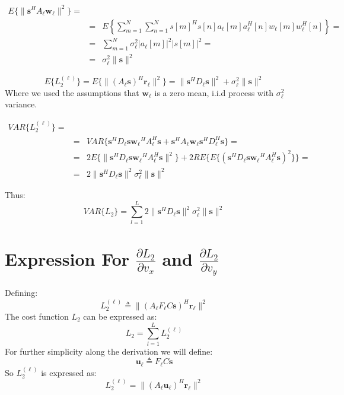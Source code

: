 \documentclass[10pt,a4paper]{report}
\begin{document}
\begin{eqnarray}
E\{\|\mathbf{s}^H A_\ell \mathbf{w_\ell}\|^2\}= \\
&=& E\left\{\sum_{m=1}^N\sum_{n=1}^N s[m]^H s[n] a_\ell[m] a_\ell^H[n] w_\ell[m] w_\ell^H[n]\right\}= \nonumber \\
&=& \sum_{m=1}^N \sigma_\ell^2 |a_\ell[m]|^2 |s[m]|^2 = \nonumber \\
&=& \sigma_\ell^2 \|\mathbf{s}\|^2 \nonumber
\end{eqnarray}

\begin{equation}
E\{L_2^{(\ell)}\}=E\{\|(A_\ell\mathbf{s})^H\mathbf{r_\ell}\|^2\}= \|\mathbf{s}^H D_\ell \mathbf{s}\|^2 + \sigma_\ell^2\|\mathbf{s}\|^2
\end{equation}
Where we used the assumptions that $\mathbf{w_\ell}$ is a zero mean, i.i.d process with $\sigma_\ell^2$ variance.

\begin{eqnarray}
VAR\{L_2^{(\ell)}\} = \\
&=&VAR\{ \mathbf{s}^H D_\ell \mathbf{s}\mathbf{w_\ell}^H A_\ell^H \mathbf{s} + \mathbf{s}^H A_\ell \mathbf{w_\ell}\mathbf{s}^H D_\ell^H \mathbf{s}\} = \nonumber\\
&=&2E\{\| \mathbf{s}^H D_\ell \mathbf{s}\mathbf{w_\ell}^H A_\ell^H \mathbf{s} \|^2 \} + 2RE \{E\{(\mathbf{s}^H D_\ell \mathbf{s}\mathbf{w_\ell}^H A_\ell^H \mathbf{s})^2 \}\} =  \nonumber \\
&=&2\| \mathbf{s}^H D_\ell \mathbf{s}\|^2\sigma_\ell^2\|\mathbf{s}\|^2 \nonumber
\end{eqnarray}

Thus:
\begin{equation}
VAR\{L_2\} = \sum_{l=1}^L 2\| \mathbf{s}^H D_\ell \mathbf{s}\|^2\sigma_\ell^2\|\mathbf{s}\|^2
\end{equation}


\section{Expression For $\frac{\partial L_2}{\partial v_x}$ and $\frac{\partial L_2}{\partial v_y}$}
\label{d_L2_dvx_d_vy}
Defining:
\begin{equation}
L_2^{(\ell)} \triangleq \|\left(A_\ell F_\ell C \mathbf{s} \right)^H\mathbf{r_\ell}\|^2
\end{equation}
The cost function $L_2$ can be expressed as:
\begin{equation}
L_2 = \sum_{l=1}^L L_2^{(\ell)}
\end{equation}
For further simplicity along the derivation we will define:
\begin{equation}
\mathbf{u_\ell} \triangleq F_\ell C \mathbf{s}
\end{equation}
So $L_2^{(\ell)}$ is expressed as:
\begin{equation}
L_2^{(\ell)} = \|( A_\ell \mathbf{u_\ell})^H\mathbf{r_\ell}\|^2
\end{equation}
\end{document}
